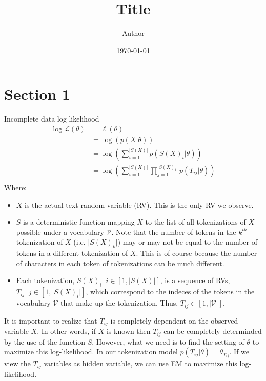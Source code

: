 \documentclass[11pt]{article}
\title{ Title}
\author{ Author }
\date{\today}
\newcommand{\logl}{\ell}
\begin{document}
\maketitle	



\section{Section 1}

Incomplete data log likelihood
\begin{align*}
    \log{\mathcal{L}}(\theta) &= \logl(\theta) \\
                              &= \log(p(X|\theta))\\
                              &= \log(\sum\limits_{i=1}^{\vert S(X)\vert} p(S(X)_i|\theta))\\
                              &= \log(\sum\limits_{i=1}^{\vert S(X)\vert} \prod\limits_{j=1}^{\vert S(X)_i\vert} p(T_{ij}|\theta))\\
\end{align*}
Where:
\begin{itemize}
    \item $X$ is the actual text random variable (RV). This is the only RV we observe.

    \item $S$ is a deterministic function mapping $X$ to the list of all tokenizations of $X$ possible under a vocabulary $\mathcal{V}$. 
        Note that the number of tokens in the $k^{th}$ tokenization of $X$ (i.e. $\vert S(X)_k \vert$) may or may not be equal to the number of tokens in a different tokenization of $X$. 
        This is of course because the number of characters in each token of tokenizations can be much different.


    \item Each tokenization, $S(X)_i \;\; i \in [1, \vert S(X) \vert ]$, is a sequence of RVs, $T_{ij} \;\; j \in [1,\vert S(X)_i \vert ] $, which correspond to the indeces of the tokens in the vocabulary $\mathcal{V}$ that make up the tokenization. 
        Thus, $T_{ij} \in [1, \vert \mathcal{V} \vert]$.
\end{itemize}
\noindent It is important to realize that $T_{ij}$ is completely dependent on the observed variable $X$. 
In other words, if $X$ is known then $T_{ij}$ can be completely determinded by the use of the function $S$.
However, what we need is to find the setting of $\theta$ to maximize this log-likelihood. 
In our tokenization model $ p(T_{ij}|\theta) = \theta_{T_{ij}}$.
If we view the $T_{ij}$ variables as hidden variable, we can use EM to maximize this log-likelihood.
\end{document}
